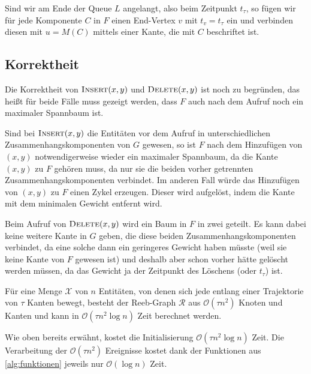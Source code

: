 Sind wir am Ende der Queue $L$ angelangt, also beim Zeitpunkt $t_\tau$, so fügen wir für jede Komponente $C$ in $F$ einen End-Vertex $v$ mit $t_v=t_\tau$ ein und verbinden diesen mit $u=M(C)$ mittels einer Kante, die mit $C$ beschriftet ist.

\subsection{Korrektheit} %
\label{sub:korrektheit_xy}
Die Korrektheit von $\textsc{Insert}(x,y)$ und $\textsc{Delete}(x,y)$ ist noch zu begründen, das heißt für beide Fälle muss gezeigt werden, dass $F$ auch nach dem Aufruf noch ein maximaler Spannbaum ist.

Sind bei $\textsc{Insert}(x,y)$ die Entitäten vor dem Aufruf in unterschiedlichen Zusammenhangskomponenten von $G$ gewesen, so ist $F$ nach dem Hinzufügen von $(x,y)$ notwendigerweise wieder ein maximaler Spannbaum, da die Kante $(x,y)$ zu $F$ gehören muss, da nur sie die beiden vorher getrennten Zusammenhangskomponenten verbindet.
Im anderen Fall würde das Hinzufügen von $(x,y)$ zu $F$ einen Zykel erzeugen.
Dieser wird aufgelöst, indem die Kante mit dem minimalen Gewicht entfernt wird.

Beim Aufruf von $\textsc{Delete}(x,y)$ wird ein Baum in $F$ in zwei geteilt.
Es kann dabei keine weitere Kante in $G$ geben, die diese beiden Zusammenhangskomponenten verbindet, da eine solche dann ein geringeres Gewicht haben müsste (weil sie keine Kante von $F$ gewesen ist) und deshalb aber schon vorher hätte gelöscht werden müssen, da das Gewicht ja der Zeitpunkt des Löschens (oder $t_\tau$) ist.

\begin{satz}[{name={\cite[Thm.~7]{buchin2015}}}]
	Für eine Menge $\mathcal{X}$ von $n$ Entitäten, von denen sich jede entlang einer Trajektorie von $\tau$ Kanten bewegt, besteht der Reeb-Graph $\mathcal{R}$ aus $\mathcal{O}(\tau n^2)$ Knoten und Kanten und kann in $\mathcal{O}(\tau n^2 \log n)$ Zeit berechnet werden.
\end{satz}
\begin{beweis}
	Wie oben bereits erwähnt, kostet die Initialisierung $\mathcal{O}(\tau n^2 \log n)$ Zeit.
	Die Verarbeitung der $\mathcal{O}(\tau n^2)$ Ereignisse kostet dank der Funktionen aus \cref{alg:funktionen} jeweils nur $\mathcal{O}(\log n)$ Zeit.
\end{beweis}


